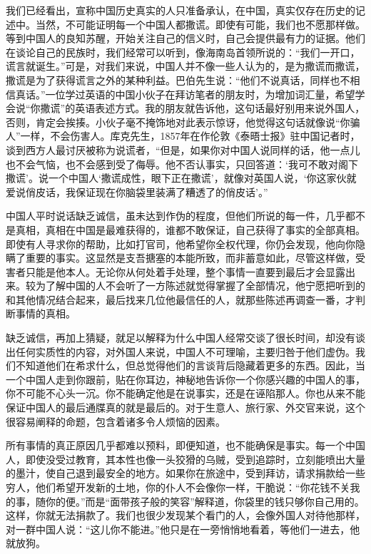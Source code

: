 \documentclass[12pt,oneside]{book}
\begin{document}
\begin{common-format}
我们已经看出，宣称中国历史真实的人只准备承认，在中国，真实仅存在历史的记述中。当然，不可能证明每一个中国人都撒谎。即使有可能，我们也不愿那样做。等到中国人的良知苏醒，开始关注自己的信义时，自己会提供最有力的证据。他们在谈论自己的民族时，我们经常可以听到，像海南岛首领所说的：“我们一开口，谎言就诞生。”可是，对我们来说，中国人并不像一些人认为的，是为撒谎而撒谎，撒谎是为了获得谎言之外的某种利益。巴伯先生说：“他们不说真话，同样也不相信真话。”一位学过英语的中国小伙子在拜访笔者的朋友时，为增加词汇量，希望学会说“你撒谎”的英语表述方式。我的朋友就告诉他，这句话最好别用来说外国人，否则，肯定会挨揍。小伙子毫不掩饰地对此表示惊讶，他觉得这句话就像说“你骗人”一样，不会伤害人。库克先生，1857年在作伦敦《泰晤士报》驻中国记者时，谈到西方人最讨厌被称为说谎者，“但是，如果你对中国人说同样的话，他一点儿也不会气恼，也不会感到受了侮辱。他不否认事实，只回答道：‘我可不敢对阁下撒谎’。说一个中国人‘撒谎成性，眼下正在撒谎’，就像对英国人说，‘你这家伙就爱说俏皮话，我保证现在你脑袋里装满了糟透了的俏皮话’。” 

中国人平时说话缺乏诚信，虽未达到作伪的程度，但他们所说的每一件，几乎都不是真相，真相在中国是最难获得的，谁都不敢保证，自己获得了事实的全部真相。即使有人寻求你的帮助，比如打官司，他希望你全权代理，你仍会发现，他向你隐瞒了重要的事实。这显然是支吾搪塞的本能所致，而非蓄意如此，尽管这样做，受害者只能是他本人。无论你从何处着手处理，整个事情一直要到最后才会显露出来。较为了解中国的人不会听了一方陈述就觉得掌握了全部情况，他宁愿把听到的和其他情况结合起来，最后找来几位他最信任的人，就那些陈述再调查一番，才判断事情的真相。 

缺乏诚信，再加上猜疑，就足以解释为什么中国人经常交谈了很长时间，却没有谈出任何实质性的内容，对外国人来说，中国人不可理喻，主要归咎于他们虚伪。我们不知道他们在希求什么，但总觉得他们的言谈背后隐藏着更多的东西。因此，当一个中国人走到你跟前，贴在你耳边，神秘地告诉你一个你感兴趣的中国人的事，你不可能不心头一沉。你不能确定他是在说事实，还是在诬陷那人。你也从来不能保证中国人的最后通牒真的就是最后的。对于生意人、旅行家、外交官来说，这个很容易阐释的命题，包含着诸多令人烦恼的因素。 

所有事情的真正原因几乎都难以预料，即便知道，也不能确保是事实。每一个中国人，即使没受过教育，其本性也像一头狡猾的乌贼，受到追踪时，立刻能喷出大量的墨汁，使自己退到最安全的地方。如果你在旅途中，受到拜访，请求捐款给一些穷人，他们希望开发新的土地，你的仆人不会像你一样，干脆说：“你花钱不关我的事，随你的便。”而是“面带孩子般的笑容”解释道，你袋里的钱只够你自己用的。这样，你就无法捐款了。我们也很少发现某个看门的人，会像外国人对待他那样，对一群中国人说：“这儿你不能进。”他只是在一旁悄悄地看着，等他们一进去，他就放狗。 


\end{common-format}
\end{document}
